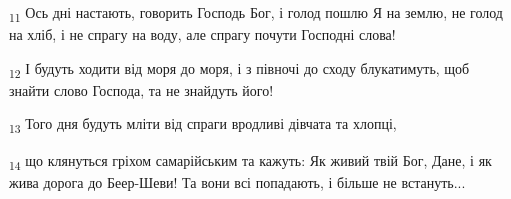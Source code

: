 \begin{tcolorbox}
\textsubscript{11} Ось дні настають, говорить Господь Бог, і голод пошлю Я на землю, не голод на хліб, і не спрагу на воду, але спрагу почути Господні слова!
\end{tcolorbox}
\begin{tcolorbox}
\textsubscript{12} І будуть ходити від моря до моря, і з півночі до сходу блукатимуть, щоб знайти слово Господа, та не знайдуть його!
\end{tcolorbox}
\begin{tcolorbox}
\textsubscript{13} Того дня будуть мліти від спраги вродливі дівчата та хлопці,
\end{tcolorbox}
\begin{tcolorbox}
\textsubscript{14} що клянуться гріхом самарійським та кажуть: Як живий твій Бог, Дане, і як жива дорога до Беер-Шеви! Та вони всі попадають, і більше не встануть...
\end{tcolorbox}
